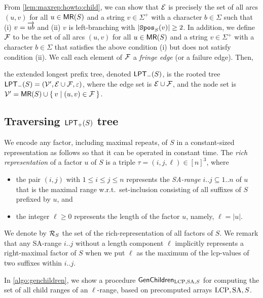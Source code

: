 \documentclass{article}
\begin{document}
From \cref{lem:maxrep:howto:child}, we can show that $\sig E$ is precisely the set of all arcs $(u, v)$ for all $u \in \MR(S)$ and a string $v \in \Sigma^+$ with a character $b \in \Sigma$ such that (i) $v = \rext{ub}$ and (ii) $v$ is left-branching with $|\Spos(v)|\ge 2$. 
In addition, we define $\sig F$ to be the set of all arcs $(u, v)$ for all $u \in \MR(S)$ and a string $v \in \Sigma^+$ with a character $b \in \Sigma$ that satisfies the above condition (i) but does not satisfy condition (ii). We call each element of $\sig F$ a \textit{fringe edge} (or a failure edge). Then,

\begin{definition}
the extended longest prefix tree, denoted $\LPT[-](S)$, is the rooted tree
$\LPT[-](S) = (\sig V', \sig E\cup\sig F, \eps)$,
where the edge set is $\sig E\cup\sig F$, and
the node set is 
$\sig V' = \MR(S) \cup \sete{ v \mid (u, v) \in \sig F  }$. 
\end{definition}

\subsection{Traversing $\LPT[+](S)$ tree}

We encode any factor, including maximal repeats, of $S$ in a constant-sized representation as follows so that it can be operated in constant time. 
The \textit{rich representation} of a factor $u$ of $S$ is a triple $\tau = (i, j, \ell) \in [n]^3$, where
\begin{itemize}
\item the pair $(i, j)$ with $1\le i\le j\le n$ represents the \textit{SA-range} $i..j\subseteq 1..n$ of $u$ that is the maximal range w.r.t.~set-inclusion consisting of all suffixes of $S$ prefixed by $u$, and  
  
\item the integer $\ell\ge 0$ represents the length of the factor $u$, namely, $\ell = |u|$. 
\end{itemize}

We denote by $\RR$ the set of the rich-representation of all factors of $S$.
We remark that any SA-range $i..j$ without a length component $\ell$ implicitly represents a right-maximal factor of $S$ when we put $\ell$ as the maximum of the lcp-values of two suffixes within $i..j$.


In \cref{algo:genchildren}, we show a procedure $\GenChildren$ for computing the set of all child ranges of an $\ell$-range, based on precomputed arrays $\LCP, \SA, S$.
\end{document}
